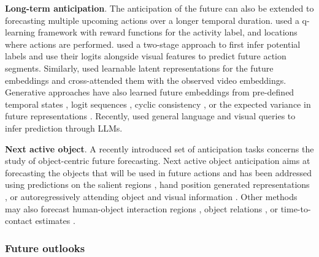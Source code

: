\noindent
\textbf{Long-term anticipation}. The anticipation of the future can also be extended to forecasting multiple upcoming actions over a longer temporal duration. \citet{bokhari2017long} used a q-learning framework with reward functions for the activity label, and locations where actions are performed. \citet{nawhal2022rethinking} used a two-stage approach to first infer potential labels and use their logits alongside visual features to predict future action segments. Similarly, \citet{gong2022future} used learnable latent representations for the future embeddings and cross-attended \citep{jaegle2021perceiver,lee2019set} them with the observed video embeddings. Generative approaches have also learned future embeddings from pre-defined temporal states \citep{piergiovanni2020adversarial}, logit sequences \citep{zhao2020diverse}, cyclic consistency \citep{abu2021long}, or the expected variance in future representations \citep{mascaro2023intention,patsch2024long}. Recently, \citet{mittal2024can} used general language and visual queries to infer prediction through LLMs.

\noindent
\textbf{Next active object}. A recently introduced set of anticipation tasks concerns the study of object-centric future forecasting. Next active object anticipation aims at forecasting the objects that will be used in future actions and has been addressed using predictions on the salient regions \citep{dessalene2021forecasting}, hand position generated representations \citep{jiang2021predicting}, or autoregressively attending object and visual information \citep{thakur2024anticipating}. Other methods may also forecast human-object interaction regions \citep{liu2020forecasting,liu2022joint,roy2024interaction}, object relations \citep{roy2021action,zatsarynna2021multi}, or time-to-contact estimates \citep{mur2024aff}.

\subsubsection{Future outlooks}

